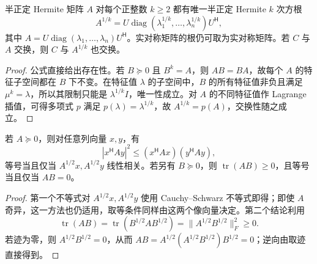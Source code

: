 \begin{proposition}
\label{prop:xie-ip-root}
半正定 Hermite 矩阵 $A$ 对每个正整数 $k\geq2$ 都有唯一半正定 Hermite $k$ 次方根
\[
A^{1/k}=U\operatorname{diag}(\lambda_1^{1/k},\ldots,\lambda_n^{1/k})U^{\mathsf H},
\]
其中 $A=U\operatorname{diag}(\lambda_1,\ldots,\lambda_n)U^{\mathsf H}$。实对称矩阵的根仍可取为实对称矩阵。若 $C$ 与 $A$ 交换，则 $C$ 与 $A^{1/k}$ 也交换。
\end{proposition}
\begin{proof}
公式直接给出存在性。若 $B\succeq0$ 且 $B^k=A$，则 $AB=BA$，故每个 $A$ 的特征子空间都在 $B$ 下不变。在特征值 $\lambda$ 的子空间中，$B$ 的所有特征值非负且满足 $\mu^k=\lambda$，所以其限制只能是 $\lambda^{1/k}I$，唯一性成立。对 $A$ 的不同特征值作 Lagrange 插值，可得多项式 $p$ 满足 $p(\lambda)=\lambda^{1/k}$，故 $A^{1/k}=p(A)$，交换性随之成立。
\end{proof}

\begin{proposition}
若 $A\succeq0$，则对任意列向量 $x,y$，有
\[
|x^{\mathsf H}Ay|^2\leq(x^{\mathsf H}Ax)(y^{\mathsf H}Ay),
\]
等号当且仅当 $A^{1/2}x,A^{1/2}y$ 线性相关。若另有 $B\succeq0$，则 $\operatorname{tr}(AB)\geq0$，且等号当且仅当 $AB=0$。
\end{proposition}
\begin{proof}
第一个不等式对 $A^{1/2}x,A^{1/2}y$ 使用 Cauchy--Schwarz 不等式即得；即使 $A$ 奇异，这一方法也仍适用，取等条件同样由这两个像向量决定。第二个结论利用
\[
\operatorname{tr}(AB)=\operatorname{tr}(B^{1/2}AB^{1/2})
=\|A^{1/2}B^{1/2}\|_F^2\geq0.
\]
若迹为零，则 $A^{1/2}B^{1/2}=0$，从而 $AB=A^{1/2}(A^{1/2}B^{1/2})B^{1/2}=0$；逆向由取迹直接得到。
\end{proof}

